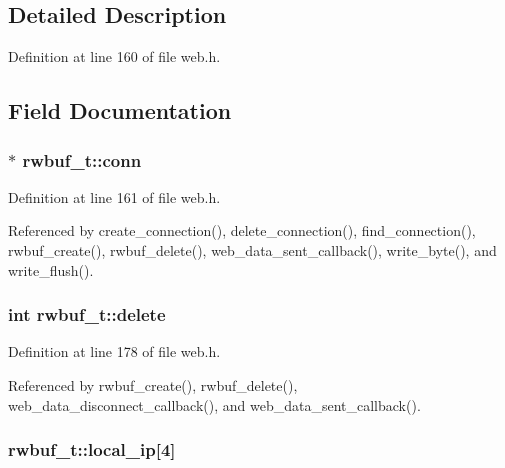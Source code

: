 \subsection{Detailed Description}


Definition at line 160 of file web.\+h.



\subsection{Field Documentation}
\subsubsection[{\texorpdfstring{conn}{conn}}]{$\ast$ rwbuf\+\_\+t\+::conn}\hypertarget{structrwbuf__t_a15785240e32c27f7af7c4b0cb1a6e39b}{}\label{structrwbuf__t_a15785240e32c27f7af7c4b0cb1a6e39b}


Definition at line 161 of file web.\+h.



Referenced by create\+\_\+connection(), delete\+\_\+connection(), find\+\_\+connection(), rwbuf\+\_\+create(), rwbuf\+\_\+delete(), web\+\_\+data\+\_\+sent\+\_\+callback(), write\+\_\+byte(), and write\+\_\+flush().

\subsubsection[{\texorpdfstring{delete}{delete}}]{\setlength{\rightskip}{0pt plus 5cm}int rwbuf\+\_\+t\+::delete}\hypertarget{structrwbuf__t_a54e278f96a331cf0a61d22094c4b9f87}{}\label{structrwbuf__t_a54e278f96a331cf0a61d22094c4b9f87}


Definition at line 178 of file web.\+h.



Referenced by rwbuf\+\_\+create(), rwbuf\+\_\+delete(), web\+\_\+data\+\_\+disconnect\+\_\+callback(), and web\+\_\+data\+\_\+sent\+\_\+callback().

\subsubsection[{\texorpdfstring{local\+\_\+ip}{local_ip}}]{ rwbuf\+\_\+t\+::local\+\_\+ip\mbox{[}4\mbox{]}}\hypertarget{structrwbuf__t_aa26b4813db79aeaa293bb1eadfde0b54}{}\label{structrwbuf__t_aa26b4813db79aeaa293bb1eadfde0b54}


